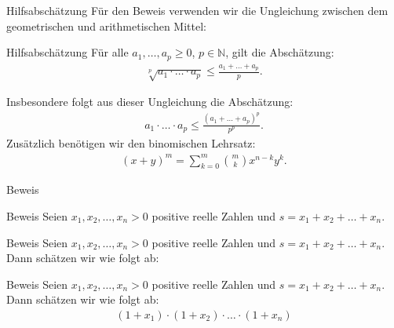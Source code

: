 \documentclass[10pt]{beamer}
\def\bN{\mathbb{N}}
\begin{document}
\begin{frame}{Hilfsabschätzung}
    Für den Beweis verwenden wir die Ungleichung zwischen dem geometrischen und arithmetischen Mittel:
    \begin{block}{Hilfsabschätzung}
        Für alle \( a_{1}, \ldots, a_{p} \geq 0 \), \( p \in \bN \), gilt die Abschätzung:
        \begin{align*}
            \sqrt[p]{a_{1} \cdot \ldots \cdot a_{p}} 
            \leq \frac{a_{1} + \ldots + a_{p}}{p}.
        \end{align*}
    \end{block}
    Insbesondere folgt aus dieser Ungleichung die Abschätzung:
    \begin{align*}
        a_{1} \cdot \ldots \cdot a_{p} 
        \leq \frac{\left( a_{1} + \ldots + a_{p} \right)^{p}}{p^{p}}.
    \end{align*}
    Zusätzlich benötigen wir den binomischen Lehrsatz:
    \begin{align*}
        \left( x + y \right)^{m}
        = \sum_{k = 0}^{m} \binom{m}{k} x^{n - k} y^{k}.
    \end{align*}
\end{frame}



\begin{frame}{Beweis}
    
\end{frame}



\begin{frame}{Beweis}
    Seien \( x_{1}, x_{2}, \ldots, x_{n} > 0 \) positive reelle Zahlen und \( s = x_{1} + x_{2} + \ldots + x_{n} \). 
\end{frame}



\begin{frame}{Beweis}
    Seien \( x_{1}, x_{2}, \ldots, x_{n} > 0 \) positive reelle Zahlen und \( s = x_{1} + x_{2} + \ldots + x_{n} \). Dann schätzen wir wie folgt ab: 
\end{frame}



\begin{frame}{Beweis}
    Seien \( x_{1}, x_{2}, \ldots, x_{n} > 0 \) positive reelle Zahlen und \( s = x_{1} + x_{2} + \ldots + x_{n} \). Dann schätzen wir wie folgt ab:
    \begin{align*}
         \left( 1 + x_{1} \right) \cdot \left( 1 + x_{2} \right) \cdot \ldots \cdot \left( 1 + x_{n} \right)
    \end{align*}
\end{frame}
\end{document}
